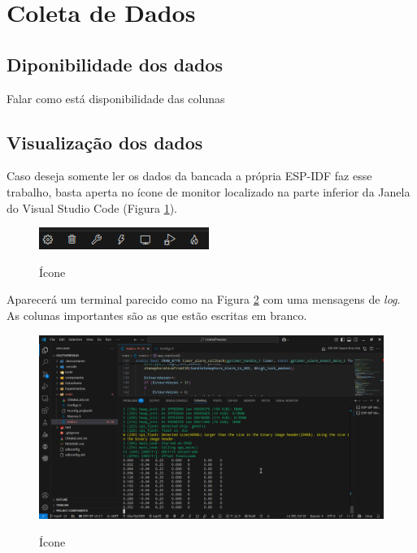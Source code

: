 \section{Coleta de Dados}

\subsection{Diponibilidade dos dados}

Falar como está disponibilidade das colunas 


\subsection{Visualização dos dados}

\tab
Caso deseja somente ler os dados da bancada a própria
ESP-IDF faz esse trabalho, basta aperta no ícone  de
monitor localizado na parte inferior da Janela do 
Visual Studio Code (Figura \ref{fig:Icones}).

\begin{figure}[!ht]
    \centering
    \caption{Ícone}
    \vspace{0.2cm}
    \includegraphics[scale=0.8]{img/icones.png}
    \label{fig:Icones}
\end{figure}

Aparecerá um terminal parecido como na Figura 
\ref{fig:Monitor} com uma mensagens de \textit{log}.
As colunas importantes são as que estão escritas em branco.

\begin{figure}[!ht]
    \centering
    \caption{Ícone}
    \vspace{0.2cm}
    \includegraphics[scale=0.2]{img/TerminalDados.png}
    \label{fig:Monitor}
\end{figure}
